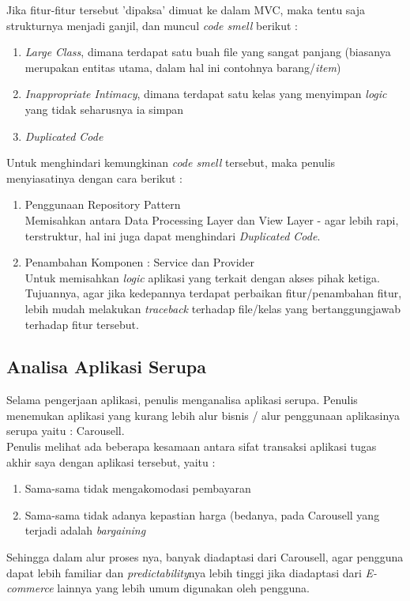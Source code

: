 \indent Jika fitur-fitur tersebut 'dipaksa' dimuat ke dalam MVC, maka tentu saja strukturnya menjadi ganjil, dan muncul \textit{code smell} berikut :
\begin{enumerate}
	\item \textit{Large Class}, dimana terdapat satu buah file yang sangat panjang (biasanya merupakan entitas utama, dalam hal ini contohnya barang/\textit{item})
	\item \textit{Inappropriate Intimacy}, dimana terdapat satu kelas yang menyimpan \textit{logic} yang tidak seharusnya ia simpan
	\item \textit{Duplicated Code}
\end{enumerate}

\indent Untuk menghindari kemungkinan \textit{code smell} tersebut, maka penulis menyiasatinya dengan cara berikut :
\begin{enumerate}
	\item Penggunaan Repository Pattern
	\\ Memisahkan antara Data Processing Layer dan View Layer - agar lebih rapi, terstruktur, hal ini juga dapat menghindari \textit{Duplicated Code}.
	\item Penambahan Komponen : Service dan Provider \\
	Untuk memisahkan \textit{logic} aplikasi yang terkait dengan akses pihak ketiga. Tujuannya, agar jika kedepannya terdapat perbaikan fitur/penambahan fitur, lebih mudah melakukan \textit{traceback} terhadap file/kelas yang bertanggungjawab terhadap fitur tersebut.
\end{enumerate}

\subsection{Analisa Aplikasi Serupa}
\label{alasan-app-serupa}
Selama pengerjaan aplikasi, penulis menganalisa aplikasi serupa. Penulis menemukan aplikasi yang kurang lebih alur bisnis / alur penggunaan aplikasinya serupa yaitu : Carousell. \\
\indent Penulis melihat ada beberapa kesamaan antara sifat transaksi aplikasi tugas akhir saya dengan aplikasi tersebut, yaitu :
\begin{enumerate}
	\item Sama-sama tidak mengakomodasi pembayaran
	\item Sama-sama tidak adanya kepastian harga (bedanya, pada Carousell yang terjadi adalah \textit{bargaining}
\end{enumerate}
\indent Sehingga dalam alur proses nya, banyak diadaptasi dari Carousell, agar pengguna dapat lebih familiar dan \textit{predictability}nya lebih tinggi jika diadaptasi dari \textit{E-commerce} lainnya yang lebih umum digunakan oleh pengguna.